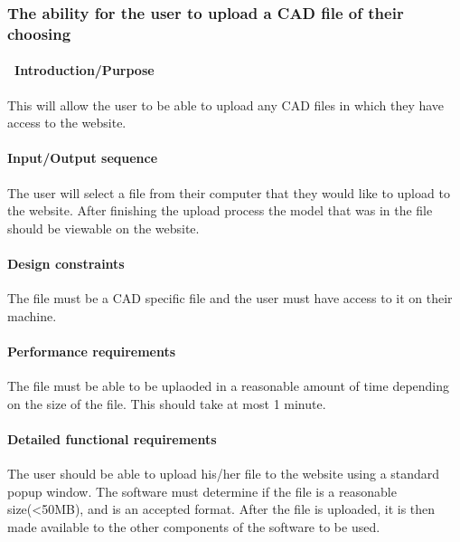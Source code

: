 \documentclass[letterpaper, 10pt, draftclsnofoot, compsoc, onecolumn]{IEEEtran}
\begin{document}
{%


\subsubsection[{File Uploading}]{\rmfamily\bfseries\color{black}The ability for the user to upload a CAD file of their choosing}
\paragraph[\ Introduction/Purpose of this
feature]{\foreignlanguage{english}{\ }\foreignlanguage{english}{Introduction/Purpose}}
{\color{black}
This will allow the user to be able to upload any CAD files in which they have access to the website. }

\paragraph[Input/Output sequence:]{\rmfamily\bfseries\color{black}
Input/Output sequence }
{\color{black}
The user will select a file from their computer that they would like to upload to the website. After finishing the upload process the 
model that was in the file should be viewable on the website. }

\paragraph[Design constraints of this
feature]{\rmfamily\bfseries\color{black} Design
constraints }
{\color{black}
The file must be a CAD specific file and the user must have access to it on their machine. }

\paragraph[Performance requirements of this
feature]{\rmfamily\bfseries\color{black}
Performance requirements }
{\color{black}
The file must be able to be uplaoded in a reasonable amount of time depending on the size of the file. This should take at most 1 minute. }

\paragraph[Detailed functional requirements of this
feature]{\rmfamily\bfseries\color{black}
Detailed functional requirements }
{\color{black} The user should be able to upload his/her file to the website using a standard popup window. The software must determine if the file is a reasonable size(<50MB), and is an accepted format. After the file is uploaded, it is then made available to the other components of the software to be used. }

}
\end{document}
